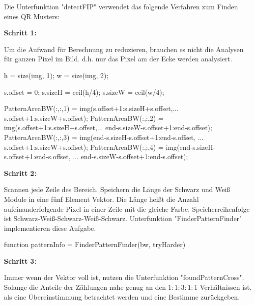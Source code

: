 Die Unterfunktion "detectFIP" verwendet das folgende Verfahren zum Finden eines QR Musters:

\textbf{Schritt 1:}

Um die Aufwand für Berechnung zu reduzieren, brauchen es nicht die Analysen für ganzen Pixel im Bild. d.h. nur das Pixel am der Ecke werden analysiert. 

\singlespacing
\begin{matlab}[firstnumber=1, name=MATLABCodeBeispiel, caption={Detektion Bereich}, label={lst:Detektion Bereich}]
    h = size(img, 1);	%
    w = size(img, 2);	%
    
 	s.offset = 0;
    s.sizeH = ceil(h/4);  %
    s.sizeW = ceil(w/4);  %

    PatternAreaBW(:,:,1) = img(s.offset+1:s.sizeH+s.offset,...
        s.offset+1:s.sizeW+s.offset);
    PatternAreaBW(:,:,2) = img(s.offset+1:s.sizeH+s.offset,...
        end-s.sizeW-s.offset+1:end-s.offset);
    PatternAreaBW(:,:,3) = img(end-s.sizeH-s.offset+1:end-s.offset, ...
        s.offset+1:s.sizeW+s.offset);
    PatternAreaBW(:,:,4) = img(end-s.sizeH-s.offset+1:end-s.offset, ...
        end-s.sizeW-s.offset+1:end-s.offset);

\end{matlab}
\onehalfspacing

\textbf{Schritt 2:}

Scannen jede Zeile des Bereich. Speichern die Länge der Schwarz und Weiß Module in eine fünf Element Vektor. Die Länge heißt die Anzahl aufeinanderfolgende Pixel in einer Zeile mit die gleiche Farbe. Speicherreihenfolge ist Schwarz-Weiß-Schwarz-Weiß-Schwarz. Unterfunktion "FinderPatternFinder" implementieren diese Aufgabe.

\singlespacing
\begin{matlab}[firstnumber=1, name=MATLABCodeBeispiel, caption={MATLAB Code Beispiel}, label={lst:MATLABCodeBeispiel}]

function patternInfo = FinderPatternFinder(bw, tryHarder)

\end{matlab}

\textbf{Schritt 3:}

Immer wenn der Vektor voll ist, nutzen die Unterfunktion "foundPatternCross". Solange die Anteile der Zählungen nahe genug an den $1:1:3:1:1$ Verhältnissen ist, als eine Übereinstimmung betrachtet werden und eine Bestimme zurückgeben.

